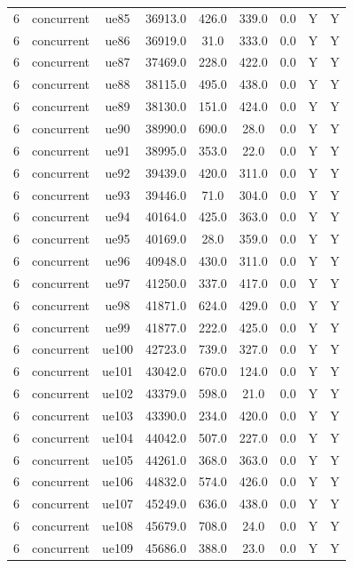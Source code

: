 \begin{table}[ht]
\begin{tabular}{|c|c|c|c|c|c|c|c|c|}
6 & concurrent & ue85 & 36913.0 & 426.0 & 339.0 & 0.0 & Y & Y \\
6 & concurrent & ue86 & 36919.0 & 31.0 & 333.0 & 0.0 & Y & Y \\
6 & concurrent & ue87 & 37469.0 & 228.0 & 422.0 & 0.0 & Y & Y \\
6 & concurrent & ue88 & 38115.0 & 495.0 & 438.0 & 0.0 & Y & Y \\
6 & concurrent & ue89 & 38130.0 & 151.0 & 424.0 & 0.0 & Y & Y \\
6 & concurrent & ue90 & 38990.0 & 690.0 & 28.0 & 0.0 & Y & Y \\
6 & concurrent & ue91 & 38995.0 & 353.0 & 22.0 & 0.0 & Y & Y \\
6 & concurrent & ue92 & 39439.0 & 420.0 & 311.0 & 0.0 & Y & Y \\
6 & concurrent & ue93 & 39446.0 & 71.0 & 304.0 & 0.0 & Y & Y \\
6 & concurrent & ue94 & 40164.0 & 425.0 & 363.0 & 0.0 & Y & Y \\
6 & concurrent & ue95 & 40169.0 & 28.0 & 359.0 & 0.0 & Y & Y \\
6 & concurrent & ue96 & 40948.0 & 430.0 & 311.0 & 0.0 & Y & Y \\
6 & concurrent & ue97 & 41250.0 & 337.0 & 417.0 & 0.0 & Y & Y \\
6 & concurrent & ue98 & 41871.0 & 624.0 & 429.0 & 0.0 & Y & Y \\
6 & concurrent & ue99 & 41877.0 & 222.0 & 425.0 & 0.0 & Y & Y \\
6 & concurrent & ue100 & 42723.0 & 739.0 & 327.0 & 0.0 & Y & Y \\
6 & concurrent & ue101 & 43042.0 & 670.0 & 124.0 & 0.0 & Y & Y \\
6 & concurrent & ue102 & 43379.0 & 598.0 & 21.0 & 0.0 & Y & Y \\
6 & concurrent & ue103 & 43390.0 & 234.0 & 420.0 & 0.0 & Y & Y \\
6 & concurrent & ue104 & 44042.0 & 507.0 & 227.0 & 0.0 & Y & Y \\
6 & concurrent & ue105 & 44261.0 & 368.0 & 363.0 & 0.0 & Y & Y \\
6 & concurrent & ue106 & 44832.0 & 574.0 & 426.0 & 0.0 & Y & Y \\
6 & concurrent & ue107 & 45249.0 & 636.0 & 438.0 & 0.0 & Y & Y \\
6 & concurrent & ue108 & 45679.0 & 708.0 & 24.0 & 0.0 & Y & Y \\
6 & concurrent & ue109 & 45686.0 & 388.0 & 23.0 & 0.0 & Y & Y \\

\end{tabular}
\end{table}
